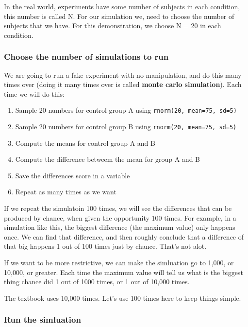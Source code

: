\documentclass[]{book}
\providecommand{\tightlist}{%
  \setlength{\itemsep}{0pt}\setlength{\parskip}{0pt}}
\theoremstyle{definition}
\theoremstyle{definition}
\theoremstyle{definition}
\theoremstyle{remark}
\begin{document}
In the real world, experiments have some number of subjects in each
condition, this number is called N. For our simulation we, need to
choose the number of subjects that we have. For this demonstration, we
choose N = 20 in each condition.

\subsubsection{Choose the number of simulations to
run}\label{choose-the-number-of-simulations-to-run}

We are going to run a fake experiment with no manipulation, and do this
many times over (doing it many times over is called \textbf{monte carlo
simulation}). Each time we will do this:

\begin{enumerate}
\def\labelenumi{\arabic{enumi}.}
\tightlist
\item
  Sample 20 numbers for control group A using
  \texttt{rnorm(20,\ mean=75,\ sd=5)}
\item
  Sample 20 numbers for control group B using
  \texttt{rnorm(20,\ mean=75,\ sd=5)}
\item
  Compute the means for control group A and B
\item
  Compute the difference betweem the mean for group A and B
\item
  Save the differences score in a variable
\item
  Repeat as many times as we want
\end{enumerate}

If we repeat the simulatoin 100 times, we will see the differences that
can be produced by chance, when given the opportunity 100 times. For
example, in a simulation like this, the biggest difference (the maximum
value) only happens once. We can find that difference, and then roughly
conclude that a difference of that big happens 1 out of 100 times just
by chance. That's not alot.

If we want to be more restrictive, we can make the simluation go to
1,000, or 10,000, or greater. Each time the maximum value will tell us
what is the biggest thing chance did 1 out of 1000 times, or 1 out of
10,000 times.

The textbook uses 10,000 times. Let's use 100 times here to keep things
simple.

\subsubsection{Run the simluation}\label{run-the-simluation}
\end{document}
